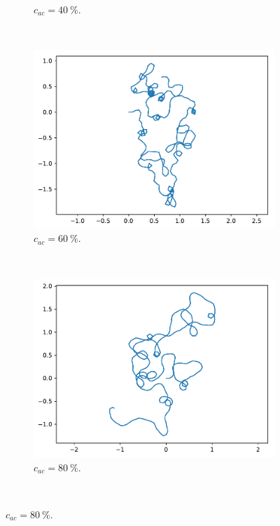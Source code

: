 \begin{appendices}
\begin{figure}[htb]
\begin{subfigure}[t]{\subImgWarea}
			\caption{$c_{ac} = 40~\%$.}
			\label{fig:2_19_autocorr_2_19_180_32_0_4}
		\end{subfigure}
		~
		\begin{subfigure}[t]{\subImgWarea}
			\centering
			\includegraphics[width=\textwidth]{figures/ch3/2_19_autocorr_2_19_180_32_0_6}
			\caption{$c_{ac} = 60~\%$.}
			\label{fig:2_19_autocorr_2_19_180_32_0_6}
		\end{subfigure}
		~
		\begin{subfigure}[t]{\subImgWarea}
			\centering
			\includegraphics[width=\textwidth]{figures/ch3/2_19_autocorr_2_19_180_32_0_8}
			\caption{$c_{ac} = 80~\%$.}
			\label{fig:2_19_autocorr_2_19_180_32_0_8}
		\end{subfigure}
		~

\end{figure}
\end{appendices}
